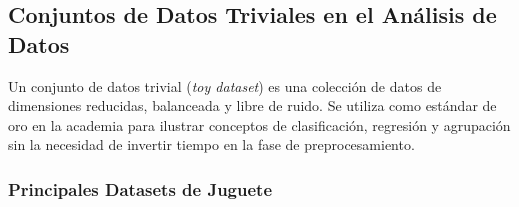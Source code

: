 \subsection*{Conjuntos de Datos Triviales en el Análisis de Datos}

Un conjunto de datos trivial (\textit{toy dataset}) es una colección de datos de dimensiones reducidas, balanceada y libre de ruido. Se utiliza como estándar de oro en la academia para ilustrar conceptos de clasificación, regresión y agrupación sin la necesidad de invertir tiempo en la fase de preprocesamiento.

\subsubsection{Principales Datasets de Juguete}

